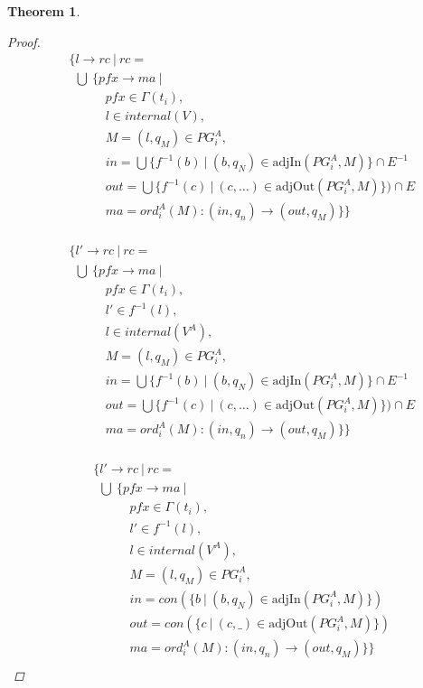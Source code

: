 \documentclass[twocolumn]{sig-alternate-10pt}
\newtheorem{thm}{Theorem}[section]
\begin{document}
\begin{thm}
\begin{proof}
  \[ \begin{array}{l}
     ~~~~~ \{ l \rightarrow rc ~\vert~ rc = \\
     ~~~~~~~ \bigcup~ \{ pfx \rightarrow ma ~\vert~ \\
     ~~~~~~~~~~~~~~~~~~ pfx \in \Gamma(t_i), \\
     ~~~~~~~~~~~~~~~~~~ l \in internal(V), \\
     ~~~~~~~~~~~~~~~~~~ M = (l,q_M) \in PG^A_i, \\
     ~~~~~~~~~~~~~~~~~~ in = \bigcup \{ f^{-1}(b) ~\vert~ (b,q_N) \in \text{adjIn}(PG^A_i,M) \} \cap E^{-1} \\
     ~~~~~~~~~~~~~~~~~~ out = \bigcup \{ f^{-1}(c) ~\vert~ (c,\dots) \in \text{adjOut}(PG^A_i,M) \}) \cap E \\ 
     ~~~~~~~~~~~~~~~~~~ ma = ord^A_i(M) : (in,q_n) \rightarrow (out,q_M) \} \} \\
  \end{array} \]%

  \[ \begin{array}{l}
     ~~~~~ \{ l' \rightarrow rc ~\vert~ rc = \\
     ~~~~~~~ \bigcup~ \{ pfx \rightarrow ma ~\vert~ \\
     ~~~~~~~~~~~~~~~~~~ pfx \in \Gamma(t_i), \\
     ~~~~~~~~~~~~~~~~~~ l' \in f^{-1}(l), \\
     ~~~~~~~~~~~~~~~~~~ l \in internal(V^A), \\
     ~~~~~~~~~~~~~~~~~~ M = (l,q_M) \in PG^A_i, \\
     ~~~~~~~~~~~~~~~~~~ in = \bigcup \{ f^{-1}(b) ~\vert~ (b,q_N) \in \text{adjIn}(PG^A_i,M) \} \cap E^{-1} \\
     ~~~~~~~~~~~~~~~~~~ out = \bigcup \{ f^{-1}(c) ~\vert~ (c,\dots) \in \text{adjOut}(PG^A_i,M) \}) \cap E \\ 
     ~~~~~~~~~~~~~~~~~~ ma = ord^A_i(M) : (in,q_n) \rightarrow (out,q_M) \} \} \\
  \end{array} \]%

  \[ \begin{array}{l}
     ~~~~~ \{ l' \rightarrow rc ~\vert~ rc = \\
     ~~~~~~~ \bigcup~ \{ pfx \rightarrow ma ~\vert~ \\
     ~~~~~~~~~~~~~~~~~~ pfx \in \Gamma(t_i), \\
     ~~~~~~~~~~~~~~~~~~ l' \in f^{-1}(l), \\
     ~~~~~~~~~~~~~~~~~~ l \in internal(V^A), \\
     ~~~~~~~~~~~~~~~~~~ M = (l,q_M) \in PG^A_i, \\
     ~~~~~~~~~~~~~~~~~~ in = con(\{ b ~\vert~ (b,q_N) \in \text{adjIn}(PG^A_i,M) \}) \\
     ~~~~~~~~~~~~~~~~~~ out = con(\{ c ~\vert~ (c,\_) \in \text{adjOut}(PG^A_i,M) \}) \\
     ~~~~~~~~~~~~~~~~~~ ma = ord^A_i(M) : (in,q_n) \rightarrow (out,q_M) \} \} \\
  \end{array} \]%


\end{proof}
\end{thm}
\end{document}
